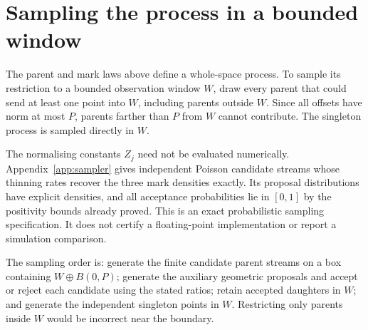 \section{Sampling the process in a bounded window}
\label{sec:sampling}

The parent and mark laws above define a whole-space process. To sample its restriction to a bounded observation window $W$, draw every parent that could send at least one point into $W$, including parents outside $W$. Since all offsets have norm at most $P$, parents farther than $P$ from $W$ cannot contribute. The singleton process is sampled directly in $W$.

The normalising constants $Z_j$ need not be evaluated numerically. Appendix~\ref{app:sampler} gives independent Poisson candidate streams whose thinning rates recover the three mark densities exactly. Its proposal distributions have explicit densities, and all acceptance probabilities lie in $[0,1]$ by the positivity bounds already proved. This is an exact probabilistic sampling specification. It does not certify a floating-point implementation or report a simulation comparison.

The sampling order is: generate the finite candidate parent streams on a box containing $W\oplus B(0,P)$; generate the auxiliary geometric proposals and accept or reject each candidate using the stated ratios; retain accepted daughters in $W$; and generate the independent singleton points in $W$. Restricting only parents inside $W$ would be incorrect near the boundary.
